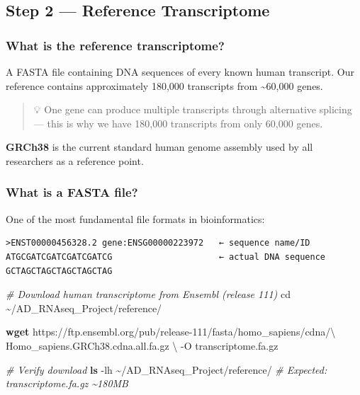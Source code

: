 \documentclass[
]{article}
\newenvironment{Shaded}{\begin{snugshade}}{\end{snugshade}}
\newcommand{\AttributeTok}[1]{\textcolor[rgb]{0.13,0.29,0.53}{#1}}
\newcommand{\BuiltInTok}[1]{#1}
\newcommand{\CommentTok}[1]{\textcolor[rgb]{0.56,0.35,0.01}{\textit{#1}}}
\newcommand{\DataTypeTok}[1]{\textcolor[rgb]{0.13,0.29,0.53}{#1}}
\newcommand{\FunctionTok}[1]{\textcolor[rgb]{0.13,0.29,0.53}{\textbf{#1}}}
\newcommand{\NormalTok}[1]{#1}
\begin{document}
\subsection{Step 2 --- Reference
Transcriptome}\label{step-2-reference-transcriptome}

\subsubsection{What is the reference
transcriptome?}\label{what-is-the-reference-transcriptome}

A FASTA file containing DNA sequences of every known human transcript.
Our reference contains approximately 180,000 transcripts from
\textasciitilde60,000 genes.

\begin{quote}
💡 One gene can produce multiple transcripts through alternative
splicing --- this is why we have 180,000 transcripts from only 60,000
genes.
\end{quote}

\textbf{GRCh38} is the current standard human genome assembly used by
all researchers as a reference point.

\subsubsection{What is a FASTA file?}\label{what-is-a-fasta-file}

One of the most fundamental file formats in bioinformatics:

\begin{verbatim}
>ENST00000456328.2 gene:ENSG00000223972   ← sequence name/ID
ATGCGATCGATCGATCGATCG                     ← actual DNA sequence
GCTAGCTAGCTAGCTAGCTAG
\end{verbatim}

\begin{Shaded}
\begin{Highlighting}[]
\CommentTok{\# Download human transcriptome from Ensembl (release 111)}
\BuiltInTok{cd}\NormalTok{ \textasciitilde{}/AD\_RNAseq\_Project/reference/}

\FunctionTok{wget}\NormalTok{ https://ftp.ensembl.org/pub/release{-}111/fasta/homo\_sapiens/cdna/}\DataTypeTok{\textbackslash{}}
\NormalTok{Homo\_sapiens.GRCh38.cdna.all.fa.gz }\DataTypeTok{\textbackslash{}}
\NormalTok{{-}O transcriptome.fa.gz}

\CommentTok{\# Verify download}
\FunctionTok{ls} \AttributeTok{{-}lh}\NormalTok{ \textasciitilde{}/AD\_RNAseq\_Project/reference/}
\CommentTok{\# Expected: transcriptome.fa.gz \textasciitilde{}180MB}
\end{Highlighting}
\end{Shaded}
\end{document}

